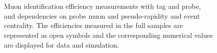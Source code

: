 \begin{figure}[hp]
  \begin{center}
     \\ %
     \\
    \caption{Muon identification efficiency measurements with tag and probe, and dependencies on probe muon \pt and pseudo-rapidity and event centrality. The efficiencies measured in the full samples are represented as open symbols and the corresponding numerical values are displayed for data and simulation.}
    \label{fig:tnpMuIDEff} %
  \end{center}
\end{figure}


